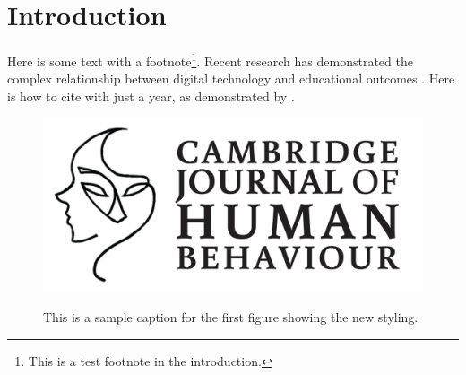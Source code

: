 \documentclass[12pt]{article}
\begin{document}
\section{Introduction}
\begin{sectiontext}
Here is some text with a footnote\footnote{This is a test footnote in the introduction.}. Recent research has demonstrated the complex relationship between digital technology and educational outcomes \parencite{patel2023divide}. Here is how to cite with just a year, as demonstrated by \textcite{2023}. \lipsum

\begin{figure}
    \caption{This is a sample caption for the first figure showing the new styling.}
    \includegraphics[width=\linewidth]{images/article_upper_logo.png}
    \label{fig:first}
\end{figure}


\end{sectiontext}
\end{document}
